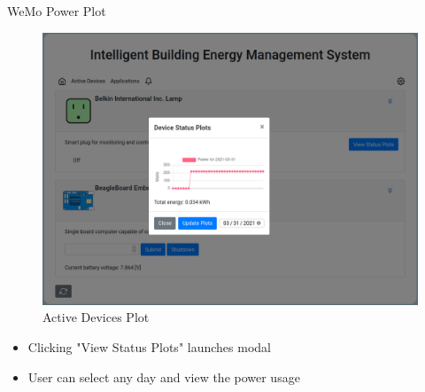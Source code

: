 \documentclass{beamer}
\begin{document}
\begin{frame}{WeMo Power Plot}{} %
    \begin{figure}
        \centering
        \includegraphics[scale=0.15]{figs/ActiveDevices_plot.png}
        \caption{Active Devices Plot}
        \label{fig:active_devices_plot}
    \end{figure}
    \begin{block}{}
      \begin{small}
        \begin{itemize}
            \item Clicking "View Status Plots" launches modal
            \item User can select any day and view the power usage
        \end{itemize}
      \end{small}
    \end{block}
\end{frame}
\end{document}
